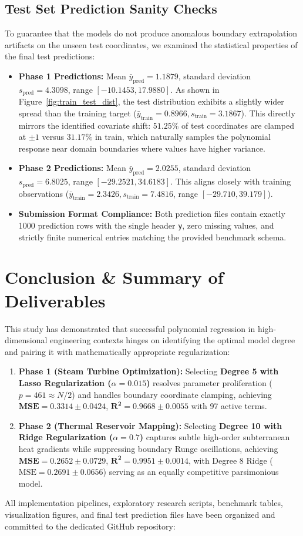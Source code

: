 \documentclass[10pt,twocolumn]{article}
\begin{document}
\subsection{Test Set Prediction Sanity Checks}
To guarantee that the models do not produce anomalous boundary extrapolation artifacts on the unseen test coordinates, we examined the statistical properties of the final test predictions:
\begin{itemize}\setlength{\itemsep}{1pt}
    \item \textbf{Phase 1 Predictions:} Mean $\bar{y}_{\text{pred}} = 1.1879$, standard deviation $s_{\text{pred}} = 4.3098$, range $[-10.1453, 17.9880]$. As shown in Figure~\ref{fig:train_test_dist}, the test distribution exhibits a slightly wider spread than the training target ($\bar{y}_{\text{train}} = 0.8966, s_{\text{train}} = 3.1867$). This directly mirrors the identified covariate shift: $51.25\%$ of test coordinates are clamped at $\pm 1$ versus $31.17\%$ in train, which naturally samples the polynomial response near domain boundaries where values have higher variance.
    \item \textbf{Phase 2 Predictions:} Mean $\bar{y}_{\text{pred}} = 2.0255$, standard deviation $s_{\text{pred}} = 6.8025$, range $[-29.2521, 34.6183]$. This aligns closely with training observations ($\bar{y}_{\text{train}} = 2.3426, s_{\text{train}} = 7.4816$, range $[-29.710, 39.179]$).
    \item \textbf{Submission Format Compliance:} Both prediction files contain exactly 1000 prediction rows with the single header \texttt{y}, zero missing values, and strictly finite numerical entries matching the provided benchmark schema.
\end{itemize}

\section{Conclusion \& Summary of Deliverables}
This study has demonstrated that successful polynomial regression in high-dimensional engineering contexts hinges on identifying the optimal model degree and pairing it with mathematically appropriate regularization:
\begin{enumerate}\setlength{\itemsep}{1pt}
    \item \textbf{Phase 1 (Steam Turbine Optimization):} Selecting \textbf{Degree 5 with Lasso Regularization ($\alpha = 0.015$)} resolves parameter proliferation ($p=461 \approx N/2$) and handles boundary coordinate clamping, achieving $\mathbf{\text{MSE} = 0.3314 \pm 0.0424}$, $\mathbf{R^2 = 0.9668 \pm 0.0055}$ with 97 active terms.
    \item \textbf{Phase 2 (Thermal Reservoir Mapping):} Selecting \textbf{Degree 10 with Ridge Regularization ($\alpha = 0.7$)} captures subtle high-order subterranean heat gradients while suppressing boundary Runge oscillations, achieving $\mathbf{\text{MSE} = 0.2652 \pm 0.0729}$, $\mathbf{R^2 = 0.9951 \pm 0.0014}$, with Degree 8 Ridge ($\text{MSE}=0.2691 \pm 0.0656$) serving as an equally competitive parsimonious model.
\end{enumerate}

All implementation pipelines, exploratory research scripts, benchmark tables, visualization figures, and final test prediction files have been organized and committed to the dedicated GitHub repository:
\begin{center}
\end{center}
\end{document}

